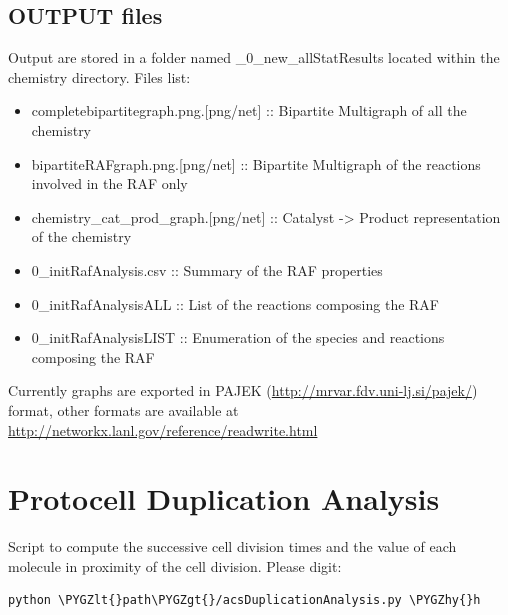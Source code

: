 \documentclass[letterpaper,10pt,english]{sphinxmanual}
\def\PYGZlt{\char`\<}
\def\PYGZgt{\char`\>}
\def\PYGZhy{\char`\-}
\begin{document}
\subsection{OUTPUT files}
\label{graph_chemistry_analysis:output-files}
Output are stored in a folder named \_0\_new\_allStatResults located within the chemistry directory. 
Files list:
\begin{itemize}
\item {} 
completebipartitegraph.png.{[}png/net{]} :: Bipartite Multigraph of all the chemistry

\item {} 
bipartiteRAFgraph.png.{[}png/net{]} :: Bipartite Multigraph of the reactions involved in the RAF only

\item {} 
chemistry\_cat\_prod\_graph.{[}png/net{]} :: Catalyst -\textgreater{} Product representation of the chemistry

\item {} 
0\_initRafAnalysis.csv :: Summary of the RAF properties

\item {} 
0\_initRafAnalysisALL :: List of the reactions composing the RAF

\item {} 
0\_initRafAnalysisLIST :: Enumeration of the species and reactions composing the RAF

\end{itemize}

Currently graphs are exported in PAJEK (\href{http://mrvar.fdv.uni-lj.si/pajek/}{http://mrvar.fdv.uni-lj.si/pajek/}) format, other formats are available at \href{http://networkx.lanl.gov/reference/readwrite.html}{http://networkx.lanl.gov/reference/readwrite.html}


\section{Protocell Duplication Analysis}
\label{acsDuplicationAnalysis:protocell-duplication-analysis}\label{acsDuplicationAnalysis:module-acsDuplicationAnalysis}\label{acsDuplicationAnalysis::doc}
Script to compute the successive cell division times and the value of each molecule in proximity of the cell division.
Please digit:

\begin{Verbatim}[commandchars=\\\{\}]
python \PYGZlt{}path\PYGZgt{}/acsDuplicationAnalysis.py \PYGZhy{}h
\end{Verbatim}
\end{document}
